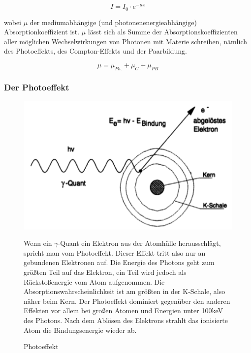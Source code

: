 $$ I = I_0\cdot e^{-\mu x} $$

wobei $\mu$ der mediumabhängige (und photonenenergieabhängige) Absorptionkoeffizient ist. $\mu$ lässt sich als Summe der Absorptionskoeffizienten aller möglichen Wechselwirkungen von Photonen mit Materie schreiben, nämlich des Photoeffekts, des Compton-Effekts und der Paarbildung.

$$\mu = \mu_{Ph.} + \mu_{C} + \mu_{PB} $$

\subsubsection{Der Photoeffekt}

\begin{figure}[H]
	\begin{minipage}{0.59\textwidth}
	\centering \includegraphics[width=\textwidth]{Bilder/Photoeffekt.png}
	\caption{Photoeffekt}
	\end{minipage}
	\begin{minipage}{0.4\textwidth}
	Wenn ein $\gamma$-Quant ein Elektron aus der Atomhülle herausschlägt, spricht man vom Photoeffekt. Dieser Effekt tritt also nur an gebundenen Elek\-tro\-nen auf. Die Energie des Photons geht zum größten Teil auf das Elektron, ein Teil wird jedoch als Rückstoßenergie vom Atom aufgenommen. Die Ab\-sorp\-tions\-wahrscheinlichkeit ist am größten in der K-Schale, also näher beim Kern. Der Photoeffekt dominiert gegenüber den anderen Effekten vor allem bei großen Atomen und Energien unter 100keV des Photons. Nach dem Ablösen des Elektrons strahlt das ionisierte Atom die Bindungsenergie wieder ab. %
	\end{minipage}
\end{figure}

